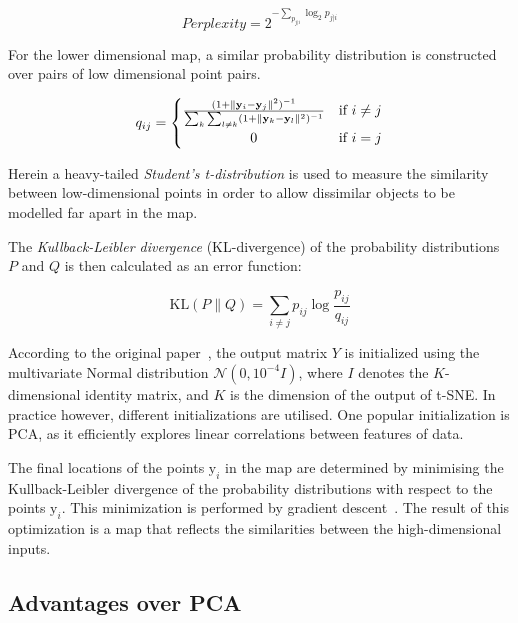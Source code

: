 \begin{equation}
	\label{eq:tsne:perlexity}
	Perplexity = 2^{-\sum_{p_{j|i}} \log_2 p_{j|i}}
\end{equation}

For the lower dimensional map, a similar probability distribution is constructed over pairs of low dimensional point pairs.

\begin{equation}
	\label{eq:tsne:qij}
	q_{ij} =
	\begin{cases}
		{\frac{(1+\lVert \mathbf{y}_{i} - \mathbf{y}_{j}\rVert^{2})^{-1}}{\sum_{k}\sum_{l \neq k}(1+\lVert \mathbf{y}_{k} - \mathbf{y}_{l}\rVert ^{2})^{-1}}} & \textrm{if } i \neq j \\
		\hfil 0 & \textrm{if } i = j
	\end{cases}
\end{equation}

Herein a heavy-tailed \textit{Student's t-distribution} is used to measure the similarity between low-dimensional points in order to allow dissimilar objects to be modelled far apart in the map.

The \textit{Kullback-Leibler divergence} (KL-divergence)\cite{bib:kldiv} of the probability distributions $P$ and $Q$ is then calculated as an error function:

\begin{equation}
	\label{eq:KLdiv}
 	\mathrm{KL} \left(P \parallel Q \right) = \sum_{i\neq j} p_{ij} \log{\frac{p_{ij}}{q_{ij}}}
\end{equation}

According to the original paper~\cite{bib:tsne}, the output matrix $Y$ is initialized using the multivariate Normal distribution  $\mathcal{N}(0,10^{-4}I)$, where $I$ denotes the $K$-dimensional identity matrix, and $K$ is the dimension of the output of t-SNE. In practice however, different initializations are utilised. One popular initialization is PCA, as it efficiently explores linear correlations between features of data.

The final locations of the points $\mathrm{y}_i$ in the map are determined by minimising the Kullback-Leibler divergence of the probability distributions with respect to the points $\mathrm{y}_i$. This minimization is performed by gradient descent~\cite{bib:gd}. The result of this optimization is a map that reflects the similarities between the high-dimensional inputs.

\subsection{Advantages over PCA}

